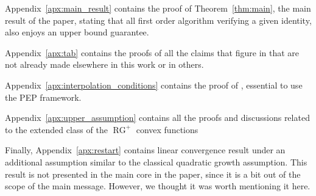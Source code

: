 \documentclass{article}
\def\RG{\operatorname{RG}}
\begin{document}
        Appendix~\ref{apx:main_result} contains the proof of Theorem~\ref{thm:main},
        the main result of the paper, stating that all first order algorithm verifying a given identity,
        also enjoys an upper bound guarantee.
        
        Appendix~\ref{apx:tab} contains the proofs of all the claims that figure in 
        that are not already made elsewhere in this work or in others.
        
        Appendix~\ref{apx:interpolation_conditions} contains the proof of ,
        essential to use the PEP framework.
        
        Appendix~\ref{apx:upper_assumption} contains all the proofs
        and discussions related to the extended class of the $\RG^+$ convex functions
        
        Finally, Appendix~\ref{apx:restart} contains linear convergence result
        under an additional assumption similar to the classical quadratic growth assumption.
        This result is not presented in the main core in the paper,
        since it is a bit out of the scope of the main message.
        However, we thought it was worth mentioning it here.
    
    \hypersetup{linkcolor = black}
    \setlength\cftparskip{2pt}
    \setlength\cftbeforesecskip{2pt}
    \setlength\cftaftertoctitleskip{3pt}
    \setcounter{tocdepth}{1}
    \tableofcontents
    \hypersetup{linkcolor=blue}
    
    
\end{document}
